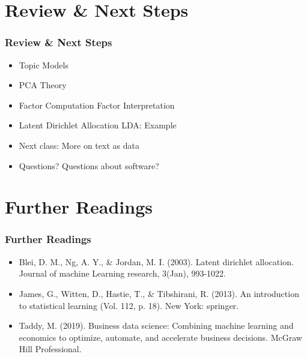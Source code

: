 \documentclass[
  shownotes,
  xcolor={svgnames},
  hyperref={colorlinks,citecolor=DarkBlue,linkcolor=DarkRed,urlcolor=DarkBlue}
  , aspectratio=169]{beamer}
\begin{document}
\section{Review
 \& Next Steps}
\begin{frame}
\frametitle{Review \& Next Steps}
  
\begin{itemize} 
  
\item Topic Models
\item PCA Theory
\item Factor Computation Factor Interpretation
\item Latent Dirichlet Allocation LDA: Example
    \bigskip  
  \item  Next class:  More on text as data


\bigskip  
\item Questions? Questions about software? 

\end{itemize}
\end{frame}
\section{Further Readings}
\begin{frame}
\frametitle{Further Readings}

\begin{itemize}
  \item Blei, D. M., Ng, A. Y., \& Jordan, M. I. (2003). Latent dirichlet allocation. Journal of machine Learning research, 3(Jan), 993-1022.

  \medskip
  \item James, G., Witten, D., Hastie, T., \& Tibshirani, R. (2013). An introduction to statistical learning (Vol. 112, p. 18). New York: springer.
  \medskip
  \item Taddy, M. (2019). Business data science: Combining machine learning and economics to optimize, automate, and accelerate business decisions. McGraw Hill Professional.

  
\end{itemize}

\end{frame}
\end{document}
